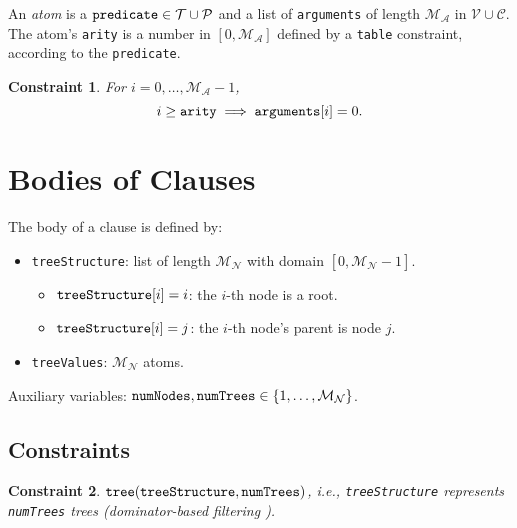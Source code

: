 \documentclass[runningheads]{llncs}
\newtheorem{constraint}{Constraint}
\newcommand{\variable}[1]{\texttt{\textup{#1}}}
\newcommand{\predicates}{\mathcal{P}}
\newcommand{\variables}{\mathcal{V}}
\newcommand{\constants}{\mathcal{C}}
\newcommand{\tokens}{\mathcal{T}}
\newcommand{\maxArity}{\mathcal{M}_{\mathcal{A}}}
\newcommand{\maxNumNodes}{\mathcal{M}_{\mathcal{N}}}
\begin{document}
\begin{definition} \label{def:atom}
  An \emph{atom} is a $\variable{predicate} \in \tokens{} \cup \predicates{}$
  and a list of \variable{arguments} of length $\maxArity{}$ in $\variables{}
  \cup \constants{}$. The atom's \variable{arity} is a number in $[0,
  \maxArity{}]$ defined by a \variable{table} constraint, according to the
  \variable{predicate}.
\end{definition}

\begin{constraint}
  For $i = 0, \dots, \maxArity{} - 1$,
  \[
    i \ge \variable{arity} \implies \variable{arguments}[i] = 0.
  \]
\end{constraint}

\section{Bodies of Clauses}

\begin{definition}
  The body of a clause is defined by:
  \begin{itemize}
  \item \variable{treeStructure}: list of length $\maxNumNodes{}$ with
    domain $[0, \maxNumNodes{} - 1]$.
    \begin{itemize}
    \item $\variable{treeStructure}[i] = i$: the $i$-th node is a root.
    \item $\variable{treeStructure}[i] = j$: the $i$-th node's parent is node $j$.
    \end{itemize}
  \item \variable{treeValues}: $\maxNumNodes{}$ atoms.
  \end{itemize}
\end{definition}

Auxiliary variables: $\variable{numNodes}, \variable{numTrees} \in \{ 1, \dots,
\maxNumNodes{} \}$.

\subsection{Constraints}

\begin{constraint}
  $\variable{tree}(\variable{treeStructure}, \variable{numTrees})$, i.e.,
  \variable{treeStructure} represents \variable{numTrees} trees (dominator-based
  filtering \cite{DBLP:conf/cp/FagesL11}).
\end{constraint}
\end{document}
